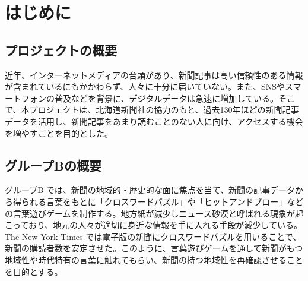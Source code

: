 \chapter{はじめに}

\section{プロジェクトの概要}
近年、インターネットメディアの台頭があり、新聞記事は高い信頼性のある情報が含まれているにもかかわらず、人々に十分に届いていない。また、SNSやスマートフォンの普及などを背景に、デジタルデータは急速に増加している。そこで、本プロジェクトは、北海道新聞社の協力のもと、過去130年ほどの新聞記事データを活用し、新聞記事をあまり読むことのない人に向け、アクセスする機会を増やすことを目的とした。

\section{グループBの概要}
グループB では、新聞の地域的・歴史的な面に焦点を当て、新聞の記事データから得られる言葉をもとに「クロスワードパズル」や「ヒットアンドブロー」などの言葉遊びゲームを制作する。地方紙が減少しニュース砂漠と呼ばれる現象が起こっており、地元の人々が適切に身近な情報を手に入れる手段が減少している。The New York Times では電子版の新聞にクロスワードパズルを用いることで、新聞の購読者数を安定させた。このように、言葉遊びゲームを通して新聞がもつ地域性や時代特有の言葉に触れてもらい、新聞の持つ地域性を再確認させることを目的とする。
